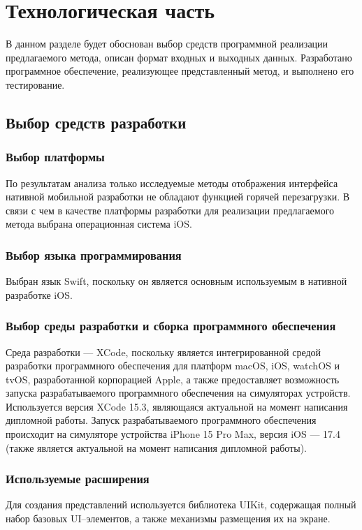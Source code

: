 \section{Технологическая часть}

В данном разделе будет обоснован выбор средств программной реализации предлагаемого метода, описан формат входных и выходных данных. 
Разработано программное обеспечение, реализующее представленный метод, и выполнено его тестирование.

\subsection{Выбор средств разработки}

\subsubsection{Выбор платформы}
По результатам анализа только исследуемые методы отображения интерфейса нативной мобильной разработки не обладают функцией горячей перезагрузки. 
В связи с чем в качестве платформы разработки для реализации предлагаемого метода выбрана операционная система iOS.

\subsubsection{Выбор языка программирования}
Выбран язык Swift, поскольку он является основным используемым в нативной разработке iOS.

\subsubsection{Выбор среды разработки и сборка программного обеспечения}
Среда разработки --- XCode, поскольку является интегрированной средой разработки программного обеспечения для платформ macOS, iOS, watchOS и tvOS, разработанной корпорацией Apple, а также предоставляет возможность запуска разрабатываемого программного обеспечения на симуляторах устройств. 
Используется версия XCode 15.3, являющаяся актуальной на момент написания дипломной работы.
Запуск разрабатываемого программного обеспечения происходит на симуляторе устройства iPhone 15 Pro Max, версия iOS --- 17.4 (также является актуальной на момент написания дипломной работы).

\subsubsection{Используемые расширения}
Для создания представлений используется библиотека UIKit, содержащая полный набор базовых UI--элементов, а также механизмы размещения их на экране. 

